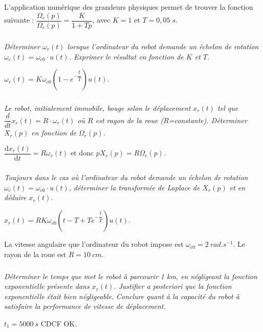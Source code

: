 \documentclass[10pt,fleqn]{article} %
\begin{document}
\begin{multicols}{2}
\ifprof
\else
L'application numérique des grandeurs physiques permet de trouver la fonction suivante : 
$\dfrac{\Omega_r(p)}{\Omega_c(p)}=\dfrac{K}{1+Tp}$, avec $K=1$ et $T=0,05\;s$.
\fi


\subparagraph{}
\textit{Déterminer $\omega_r (t)$ lorsque l’ordinateur du robot demande un échelon de rotation $\omega_c (t) = \omega_{c0} \cdot u(t)$. Exprimer le résultat en fonction de $K$ et $T$.}
\ifprof
\begin{corrige}
$\omega_r(t)=K\omega_{c0}\left(1-e^{-\dfrac{t}{T}}\right)u(t)$.
\end{corrige}
\else
\fi



\subparagraph{}
\textit{Le robot, initialement immobile, bouge selon le déplacement $x_r (t)$ tel que $\dfrac{d}{dt} x_r (t) = R\cdot \omega_r (t)$ où $R$ est rayon de la roue ($R$=constante). Déterminer $X_r (p)$ en fonction de $\Omega_r (p)$.}
\ifprof
\begin{corrige}
$\dfrac{\text{d}x_r(t)}{\text{d} t}=R\omega_r(t)$ et donc $pX_r(p)=R\Omega_r(p)$.
\end{corrige}
\else
\fi

\subparagraph{}
\textit{Toujours dans le cas où l'ordinateur du robot demande un échelon de rotation $\omega_c (t) = \omega_{c0}\cdot u(t)$, déterminer la transformée de Laplace de $X_r (p)$ et en déduire $x_r (t)$.} 
\ifprof
\begin{corrige}
$x_r(t)=RK\omega_{c0}\left( t-T+Te^{-\dfrac{t}{T}}\right)u(t)$.
\end{corrige}
\else
\fi

La vitesse angulaire que l'ordinateur du robot impose est $\omega_{c0}=\SI{2}{rad.s^{-1}}$. Le rayon de la roue est $R=\SI{10}{cm}$.  

\subparagraph{}
\textit{Déterminer le temps que met le robot à parcourir 1 km, en négligeant la fonction exponentielle présente dans $x_r (t)$. Justifier a posteriori que la fonction exponentielle était bien négligeable. Conclure quant à la capacité du robot à satisfaire la performance de vitesse de déplacement.}
\ifprof
\begin{corrige}
$t_1=\SI{5000}{s}$ CDCF OK. 
\end{corrige}
\else
\fi









\end{multicols}
\end{document}

